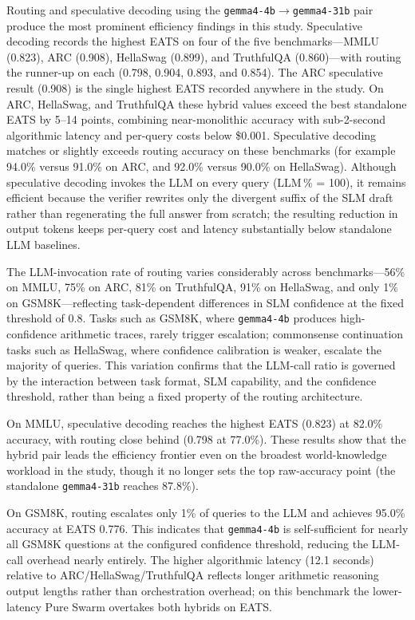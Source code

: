 Routing and speculative decoding using the \texttt{gemma4-4b}$\rightarrow$\texttt{gemma4-31b} pair produce the most prominent efficiency findings in this study. Speculative decoding records the highest EATS on four of the five benchmarks---MMLU (0.823), ARC (0.908), HellaSwag (0.899), and TruthfulQA (0.860)---with routing the runner-up on each (0.798, 0.904, 0.893, and 0.854). The ARC speculative result (0.908) is the single highest EATS recorded anywhere in the study. On ARC, HellaSwag, and TruthfulQA these hybrid values exceed the best standalone EATS by 5--14 points, combining near-monolithic accuracy with sub-2-second algorithmic latency and per-query costs below \$0.001. Speculative decoding matches or slightly exceeds routing accuracy on these benchmarks (for example 94.0\% versus 91.0\% on ARC, and 92.0\% versus 90.0\% on HellaSwag). Although speculative decoding invokes the LLM on every query (LLM\,\% = 100), it remains efficient because the verifier rewrites only the divergent suffix of the SLM draft rather than regenerating the full answer from scratch; the resulting reduction in output tokens keeps per-query cost and latency substantially below standalone LLM baselines.

The LLM-invocation rate of routing varies considerably across benchmarks---56\% on MMLU, 75\% on ARC, 81\% on TruthfulQA, 91\% on HellaSwag, and only 1\% on GSM8K---reflecting task-dependent differences in SLM confidence at the fixed threshold of 0.8. Tasks such as GSM8K, where \texttt{gemma4-4b} produces high-confidence arithmetic traces, rarely trigger escalation; commonsense continuation tasks such as HellaSwag, where confidence calibration is weaker, escalate the majority of queries. This variation confirms that the LLM-call ratio is governed by the interaction between task format, SLM capability, and the confidence threshold, rather than being a fixed property of the routing architecture.

On MMLU, speculative decoding reaches the highest EATS (0.823) at 82.0\% accuracy, with routing close behind (0.798 at 77.0\%). These results show that the hybrid pair leads the efficiency frontier even on the broadest world-knowledge workload in the study, though it no longer sets the top raw-accuracy point (the standalone \texttt{gemma4-31b} reaches 87.8\%).

On GSM8K, routing escalates only 1\% of queries to the LLM and achieves 95.0\% accuracy at EATS 0.776. This indicates that \texttt{gemma4-4b} is self-sufficient for nearly all GSM8K questions at the configured confidence threshold, reducing the LLM-call overhead nearly entirely. The higher algorithmic latency (12.1 seconds) relative to ARC/HellaSwag/TruthfulQA reflects longer arithmetic reasoning output lengths rather than orchestration overhead; on this benchmark the lower-latency Pure Swarm overtakes both hybrids on EATS.

